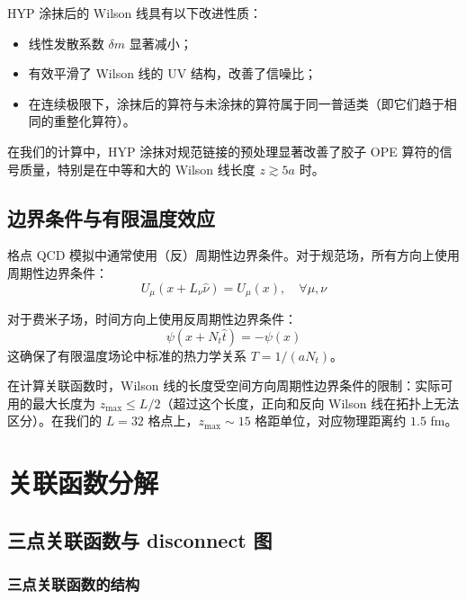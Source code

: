 \documentclass[11pt,a4paper]{ctexart}
\begin{document}
HYP 涂抹后的 Wilson 线具有以下改进性质：
\begin{itemize}
  \item 线性发散系数 $\delta m$ 显著减小；
  \item 有效平滑了 Wilson 线的 UV 结构，改善了信噪比；
  \item 在连续极限下，涂抹后的算符与未涂抹的算符属于同一普适类（即它们趋于相同的重整化算符）。
\end{itemize}

在我们的计算中，HYP 涂抹对规范链接的预处理显著改善了胶子 OPE 算符的信号质量，特别是在中等和大的 Wilson 线长度 $z \gtrsim 5a$ 时。

\subsection{边界条件与有限温度效应}

格点 QCD 模拟中通常使用（反）周期性边界条件。对于规范场，所有方向上使用周期性边界条件：
\begin{equation}
U_\mu(x + L_\nu \hat{\nu}) = U_\mu(x), \quad \forall \mu,\nu
\end{equation}

对于费米子场，时间方向上使用反周期性边界条件：
\begin{equation}
\psi(x + N_t \hat{t}) = -\psi(x)
\end{equation}
这确保了有限温度场论中标准的热力学关系 $T = 1/(a N_t)$。

在计算关联函数时，Wilson 线的长度受空间方向周期性边界条件的限制：实际可用的最大长度为 $z_{\text{max}} \le L/2$（超过这个长度，正向和反向 Wilson 线在拓扑上无法区分）。在我们的 $L=32$ 格点上，$z_{\text{max}} \sim 15$ 格距单位，对应物理距离约 $1.5$ fm。

\section{关联函数分解}

\subsection{三点关联函数与 disconnect 图}

\subsubsection{三点关联函数的结构}
\end{document}
